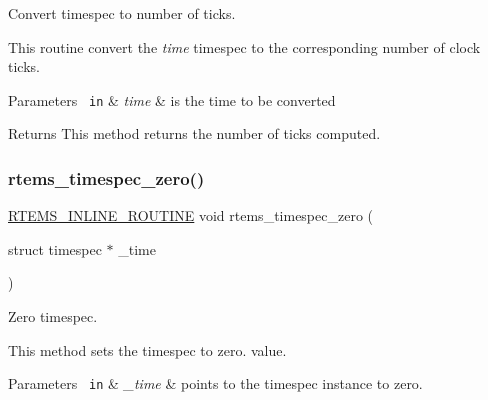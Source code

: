 Convert timespec to number of ticks. 

This routine convert the {\itshape time} timespec to the corresponding number of clock ticks.


\begin{DoxyParams}[1]{Parameters}
\mbox{\texttt{ in}}  & {\em time} & is the time to be converted\\
\hline
\end{DoxyParams}
\begin{DoxyReturn}{Returns}
This method returns the number of ticks computed. 
\end{DoxyReturn}
\mbox{\label{group__TimespecAPI_gae32732bb9825bc951cb13bf146589e15}} 
\subsubsection{\texorpdfstring{rtems\_timespec\_zero()}{rtems\_timespec\_zero()}}
{\footnotesize\ttfamily \mbox{\hyperlink{group__RTEMSScoreBaseDefs_gac216239df231d5dbd15e3520b0b9313f}{R\+T\+E\+M\+S\+\_\+\+I\+N\+L\+I\+N\+E\+\_\+\+R\+O\+U\+T\+I\+NE}} void rtems\+\_\+timespec\+\_\+zero (\begin{DoxyParamCaption}\item[{struct timespec $\ast$}]{\+\_\+time }\end{DoxyParamCaption})}



Zero timespec. 

This method sets the timespec to zero. value.


\begin{DoxyParams}[1]{Parameters}
\mbox{\texttt{ in}}  & {\em \+\_\+time} & points to the timespec instance to zero. \\
\hline
\end{DoxyParams}
